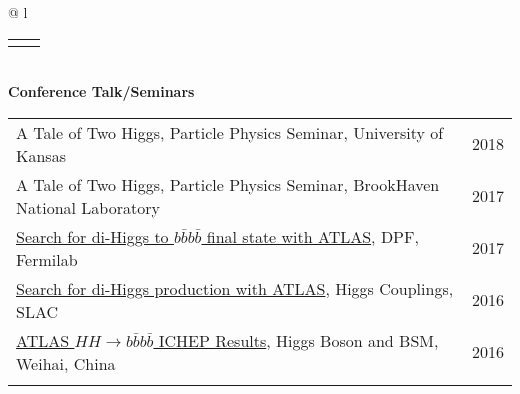 \documentclass[letterpaper,11pt,oneside]{article}
\newcommand{\blue}[1]{\textcolor[rgb]{0,0,0.9}{#1}}
\begin{document}
\begin{flushleft}
\begin{tabular}{@{} l}
\begin{tabular}{@{} l l }
    
    \hspace{0.8\linewidth} & \hspace{0.1\linewidth} \\
     \end{tabular}
     \\
     \textbf{Conference Talk/Seminars} \\
     \begin{tabular}{@{} l l }
     A Tale of Two Higgs, Particle Physics Seminar, University of Kansas & 2018\\
     A Tale of Two Higgs, Particle Physics Seminar, BrookHaven National Laboratory & 2017\\
     \blue{\href{https://indico.fnal.gov/contributionDisplay.py?contribId=70&confId=11999}{Search for di-Higgs to $b\bar{b}b\bar{b}$ final state with ATLAS}}, DPF, Fermilab & 2017\\
     \blue{\href{http://indico.cern.ch/event/477407/contributions/2295628/}{Search for di-Higgs production with ATLAS}}, Higgs Couplings, SLAC & 2016\\
     \blue{\href{http://indico.ihep.ac.cn/event/5635/session/86/contribution/40}{ATLAS $HH\to b\bar{b}b\bar{b}$ ICHEP Results}}, Higgs Boson and BSM, Weihai, China & 2016\\
    \hspace{0.8\linewidth} & \hspace{0.1\linewidth} \\
      \end{tabular}
     \\

\end{tabular}
\end{flushleft}
\end{document}
